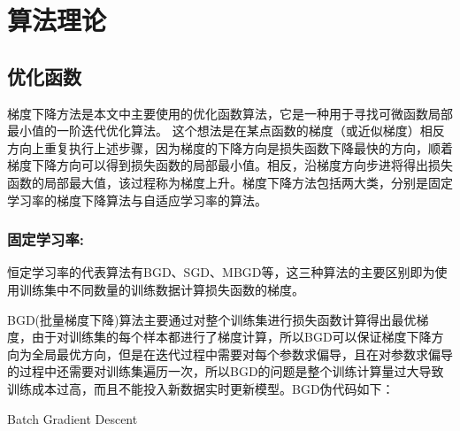 %
%
%
%
%
%
\chapter{算法理论}

\section{优化函数}

梯度下降方法是本文中主要使用的优化函数算法，它是一种用于寻找可微函数局部最小值的一阶迭代优化算法。 这个想法是在某点函数的梯度（或近似梯度）相反方向上重复执行上述步骤，因为梯度的下降方向是损失函数下降最快的方向，顺着梯度下降方向可以得到损失函数的局部最小值。相反，沿梯度方向步进将得出损失函数的局部最大值，该过程称为梯度上升。梯度下降方法包括两大类，分别是固定学习率的梯度下降算法与自适应学习率的算法。

\subsection{固定学习率:}

恒定学习率的代表算法有BGD、SGD、MBGD等，这三种算法的主要区别即为使用训练集中不同数量的训练数据计算损失函数的梯度。

BGD(批量梯度下降)算法主要通过对整个训练集进行损失函数计算得出最优梯度，由于对训练集的每个样本都进行了梯度计算，所以BGD可以保证梯度下降方向为全局最优方向，但是在迭代过程中需要对每个参数求偏导，且在对参数求偏导的过程中还需要对训练集遍历一次，所以BGD的问题是整个训练计算量过大导致训练成本过高，而且不能投入新数据实时更新模型。BGD伪代码如下：

\begin{algorithm}[H]
  \vspace{13pt} %
  \SetAlgoLined
   \caption{Batch Gradient Descent}
\end{algorithm}


